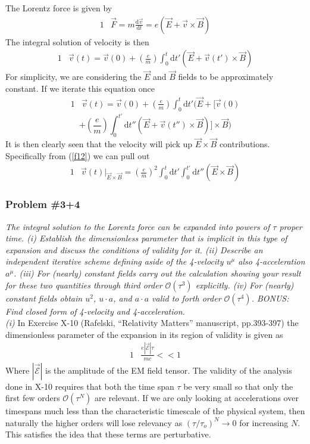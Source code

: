 \documentclass[]{article}
\numberwithin{equation}{subsection}
\begin{document}
\noindent The Lorentz force is given by  
\begin{alignat}{1}
	\label{f10}	&\vec{F}=m\frac{\mathrm{d}\vec{v}}{\mathrm{d}t}=e(\vec{E}+\vec{v}\times\vec{B})
\end{alignat}
The integral solution of velocity is then  
\begin{alignat}{1}
	\label{f11}	&\vec{v}(t)=\vec{v}(0)+(\frac{e}{m})\int_0^{t}\mathrm{d}t'(\vec{E}+\vec{v}(t')\times\vec{B})
\end{alignat}
For simplicity, we are considering the $\vec{E}$ and $\vec{B}$ fields to be approximately constant. If we iterate this equation once
\begin{alignat}{1}
	\label{f12}	&\vec{v}(t)=\vec{v}(0)+(\frac{e}{m})\int_0^{t}\mathrm{d}t'(\vec{E}+\Big[\vec{v}(0)
\end{alignat}
$$
+(\frac{e}{m})\int_0^{t'}\mathrm{d}t''(\vec{E}+\vec{v}(t'')\times\vec{B})\Big]\times\vec{B})
$$
It is then clearly seen that the velocity will pick up $\vec{E}\times\vec{B}$ contributions. Specifically from (\ref{f12}) we can pull out  
\begin{alignat}{1}
	\label{f13}	&\vec{v}(t)|_{\vec{E}\times\vec{B}}=(\frac{e}{m})^{2}\int_0^{t}\mathrm{d}t'\int_0^{t'}\mathrm{d}t''(\vec{E}\times\vec{B})
\end{alignat}
\subsubsection*{Problem \#3+4}
\emph{The integral solution to the Lorentz force can be expanded into powers of $\tau$ proper time. (i) Establish the dimensionless parameter that is implicit in this type of expansion and discuss the conditions of validity for it. (ii) Describe an independent iterative scheme defining aside of the 4-velocity $u^{\mu}$ also 4-acceleration $a^{\mu}$. (iii) For (nearly) constant fields carry out the calculation showing your result for these two quantities through third order $\mathcal{O}(\tau^{3})$ explicitly. (iv) For (nearly) constant fields obtain $u^{2}$, $u\cdot a$, and $a\cdot a$ valid to forth order $\mathcal{O}(\tau^{4})$. BONUS: Find closed form of 4-velocity and 4-acceleration.}\\

\noindent \emph{(i)} In Exercise X-10 (Rafelski, ``Relativity Matters'' manuscript, pp.393-397) the dimensionless parameter of the expansion in its region of validity is given as  
\begin{alignat}{1}
	\label{f14}	&\frac{e|\vec{\mathcal{E}}|\tau}{mc}<<1
\end{alignat}
Where $|\vec{\mathcal{E}}|$ is the amplitude of the EM field tensor. The validity of the analysis done in X-10 requires that both the time span $\tau$ be very small so that only the first few orders $\mathcal{O}(\tau^{N})$ are relevant. If we are only looking at accelerations over timespans much less than the characteristic timescale of the physical system, then naturally the higher orders will lose relevancy as $(\tau/\tau_{o})^{N}\rightarrow0$ for increasing $N$. This satisfies the idea that these terms are perturbative.\\
\end{document}
